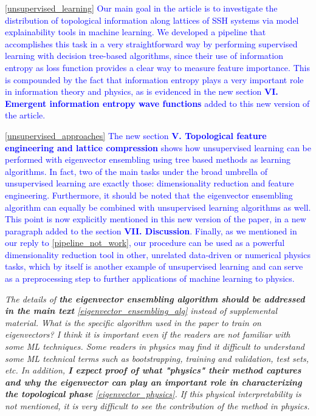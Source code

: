 \documentclass[10pt]{revtex4-1}
\newcounter{quoter}
\newcommand{\genquote}[1]{\refstepcounter{quoter} \label{#1} \ref{#1}}
\newcommand{\citequote}[1]{\ref{#1}}
\begin{document}
\vspace{0.25cm}
\textcolor{blue}{\citequote{unsupervised_learning} Our main goal in the article is to investigate the distribution of topological information along lattices of SSH systems via model explainability tools in machine learning. We developed a pipeline that accomplishes this task in a very straightforward way by performing supervised learning with decision tree-based algorithms, since their use of information entropy as loss function provides a clear way to measure feature importance. This is compounded by the fact that information entropy plays a very important role in information theory and physics, as is evidenced in the new section \textbf{VI. Emergent information entropy wave functions} added to this new version of the article.}

\textcolor{blue}{\citequote{unsupervised_approaches} The new section \textbf{V. Topological feature engineering and lattice compression} shows how unsupervised learning can be performed with eigenvector ensembling using tree based methods as learning algorithms. In fact, two of the main tasks under the broad umbrella of unsupervised learning are exactly those: dimensionality reduction and feature engineering. Furthermore, it should be noted that the eigenvector ensembling algorithm can equally be combined with unsupervised learning algorithms as well. This point is now explicitly mentioned in this new version of the paper, in a new paragraph added to the section \textbf{VII. Discussion}. Finally, as we mentioned in our reply to \citequote{pipeline_not_work}, our procedure can be used as a powerful dimensionality reduction tool in other, unrelated data-driven or numerical physics tasks, which by itself is another example of unsupervised learning and can serve as a preprocessing step to further applications of machine learning to physics.} 

\vspace{0.5cm}
\emph{The details of \textbf{the eigenvector ensembling algorithm should be addressed in the main text}\genquote{eigenvector_ensembling_alg} instead of supplemental material. What is the specific algorithm used in the paper to train on eigenvectors? I think it is important even if the readers are not familiar with some ML techniques. Some readers in physics may find it difficult to understand some ML technical terms such as bootstrapping, training and validation, test sets, etc. In addition, \textbf{I expect proof of what "physics" their method captures and why the eigenvector can play an important role in characterizing the topological phase}\genquote{eigenvector_physics}. If this physical interpretability is not mentioned, it is very difficult to see the contribution of the method in physics.}
\end{document}
